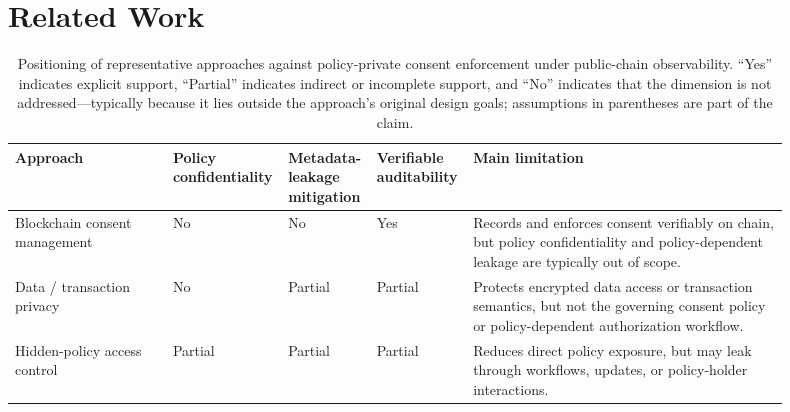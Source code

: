 \section{Related Work}
\label{sec:related-work}

\begin{table}[t]
	\centering
	\caption{Positioning of representative approaches against policy-private
		consent enforcement under public-chain observability. ``Yes'' indicates explicit
		support, ``Partial'' indicates indirect or incomplete support, and ``No''
		indicates that the dimension is not addressed---typically because it lies outside
		the approach's original design goals; assumptions in parentheses are part of the
		claim.}
	\label{tab:related-work-gap} \footnotesize
	\begin{tabular}{@{}>{\raggedright\arraybackslash}p{0.2\linewidth}>{\raggedright\arraybackslash}p{0.1\linewidth}>{\raggedright\arraybackslash}p{0.1\linewidth}>{\raggedright\arraybackslash}p{0.1\linewidth}p{0.4\linewidth}@{}}
		\hline
		\textbf{Approach}                                                                                                                        & \textbf{Policy confidentiality} & \textbf{Metadata-leakage mitigation} & \textbf{Verifiable auditability} & \textbf{Main limitation}                                                                                                                  \\
		\hline
		Blockchain consent management~\cite{kakarlapudi2021systematic,welzel2025enabling}                                                        & No                              & No                                   & Yes                              & Records and enforces consent verifiably on chain, but policy confidentiality and policy-dependent leakage are typically out of scope.     \\
		Data / transaction privacy~\cite{bethencourt2007ciphertext,ateniese2006improved,sasson2014zerocash,rondelet2019zeth,williamson2018aztec} & No                              & Partial                              & Partial                          & Protects encrypted data access or transaction semantics, but not the governing consent policy or policy-dependent authorization workflow. \\
		Hidden-policy access control~\cite{wu2023blockchain,hu2023access}                                                                        & Partial                         & Partial                              & Partial                          & Reduces direct policy exposure, but may leak through workflows, updates, or policy-holder interactions.                                   \\

\end{tabular}
\end{table}
